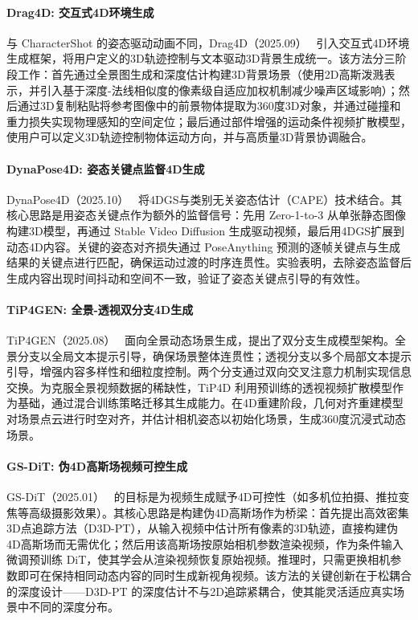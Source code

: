 \paragraph{Drag4D: 交互式4D环境生成}

与 CharacterShot 的姿态驱动动画不同，Drag4D（2025.09）~\cite{2509_21888} 引入交互式4D环境生成框架，将用户定义的3D轨迹控制与文本驱动3D背景生成统一。该方法分三阶段工作：首先通过全景图生成和深度估计构建3D背景场景（使用2D高斯泼溅表示，并引入基于深度-法线相似度的像素级自适应加权机制减少噪声区域影响）；然后通过3D复制粘贴将参考图像中的前景物体提取为360度3D对象，并通过碰撞和重力损失实现物理感知的空间定位；最后通过部件增强的运动条件视频扩散模型，使用户可以定义3D轨迹控制物体运动方向，并与高质量3D背景协调融合。

\paragraph{DynaPose4D: 姿态关键点监督4D生成}

DynaPose4D（2025.10）~\cite{2510_22473} 将4DGS与类别无关姿态估计（CAPE）技术结合。其核心思路是用姿态关键点作为额外的监督信号：先用 Zero-1-to-3 从单张静态图像构建3D模型，再通过 Stable Video Diffusion 生成驱动视频，最后用4DGS扩展到动态4D内容。关键的姿态对齐损失通过 PoseAnything 预测的逐帧关键点与生成结果的关键点进行匹配，确保运动过渡的时序连贯性。实验表明，去除姿态监督后生成内容出现时间抖动和空间不一致，验证了姿态关键点引导的有效性。

\paragraph{TiP4GEN: 全景-透视双分支4D生成}

TiP4GEN（2025.08）~\cite{2508_12415} 面向全景动态场景生成，提出了双分支生成模型架构。全景分支以全局文本提示引导，确保场景整体连贯性；透视分支以多个局部文本提示引导，增强内容多样性和细粒度控制。两个分支通过双向交叉注意力机制实现信息交换。为克服全景视频数据的稀缺性，TiP4D 利用预训练的透视视频扩散模型作为基础，通过混合训练策略迁移其生成能力。在4D重建阶段，几何对齐重建模型对场景点云进行时空对齐，并估计相机姿态以初始化场景，生成360度沉浸式动态场景。

\paragraph{GS-DiT: 伪4D高斯场视频可控生成}

GS-DiT（2025.01）~\cite{2501_02690} 的目标是为视频生成赋予4D可控性（如多机位拍摄、推拉变焦等高级摄影效果）。其核心思路是构建伪4D高斯场作为桥梁：首先提出高效密集3D点追踪方法（D3D-PT），从输入视频中估计所有像素的3D轨迹，直接构建伪4D高斯场而无需优化；然后用该高斯场按原始相机参数渲染视频，作为条件输入微调预训练 DiT，使其学会从渲染视频恢复原始视频。推理时，只需更换相机参数即可在保持相同动态内容的同时生成新视角视频。该方法的关键创新在于松耦合的深度设计——D3D-PT 的深度估计不与2D追踪紧耦合，使其能灵活适应真实场景中不同的深度分布。

